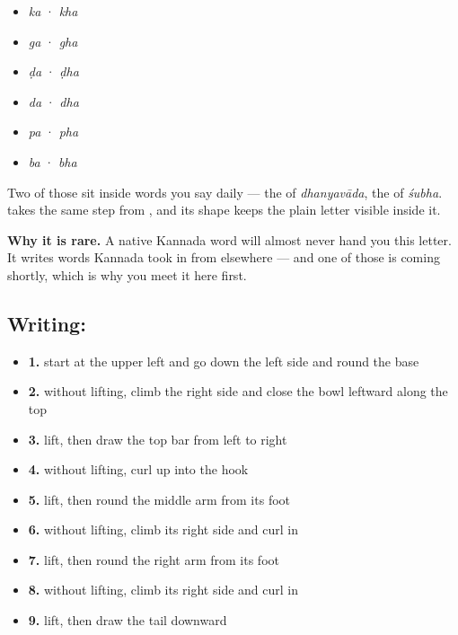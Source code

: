 \begin{itemize}
\raggedright
  \item \textbf{} \emph{ka} · \textbf{} \emph{kha}
  \item \textbf{} \emph{ga} · \textbf{} \emph{gha}
  \item \textbf{} \emph{ḍa} · \textbf{} \emph{ḍha}
  \item \textbf{} \emph{da} · \textbf{} \emph{dha}
  \item \textbf{} \emph{pa} · \textbf{} \emph{pha}
  \item \textbf{} \emph{ba} · \textbf{} \emph{bha}
\end{itemize}

Two of those sit inside words you say daily — the \textbf{} of \textbf{} \emph{dhanyavāda}, the \textbf{} of \textbf{} \emph{śubha}. \textbf{} takes the same step from \textbf{}, and its shape keeps the plain letter visible inside it.

\textbf{Why it is rare.} A native Kannada word will almost never hand you this letter. It writes words Kannada took in from elsewhere — and one of those is coming shortly, which is why you meet it here first.

\subsection*{Writing: }

\begin{itemize}
\raggedright
  \item \textbf{1.} start at the upper left and go down the left side and round the base
  \item \textbf{2.} without lifting, climb the right side and close the bowl leftward along the top
  \item \textbf{3.} lift, then draw the top bar from left to right
  \item \textbf{4.} without lifting, curl up into the hook
  \item \textbf{5.} lift, then round the middle arm from its foot
  \item \textbf{6.} without lifting, climb its right side and curl in
  \item \textbf{7.} lift, then round the right arm from its foot
  \item \textbf{8.} without lifting, climb its right side and curl in
  \item \textbf{9.} lift, then draw the tail downward
\end{itemize}

